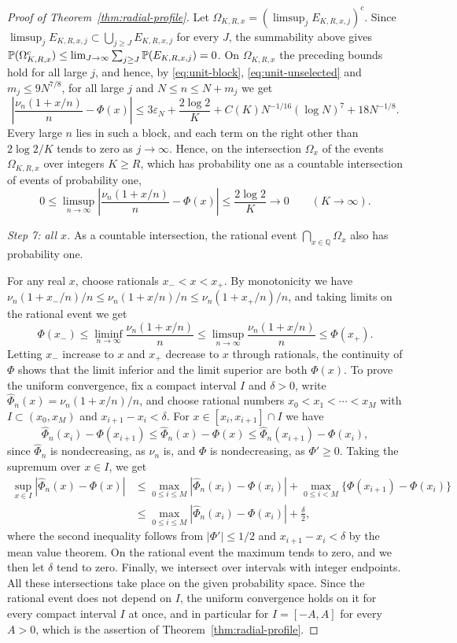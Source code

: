\begin{proof}[Proof of Theorem~\ref{thm:radial-profile}]
Let $\Omega_{K,R,x}=(\limsup_jE_{K,R,x,j})^c$.
Since $\limsup_jE_{K,R,x,j}\subset\bigcup_{j\ge J}E_{K,R,x,j}$ for every
$J$, the summability above gives
$\mathbb P(\Omega_{K,R,x}^c)\le\lim_{J\to\infty}\sum_{j\ge J}\mathbb P(E_{K,R,x,j})=0$.
On $\Omega_{K,R,x}$ the preceding bounds hold for all large $j$, and
hence, by \eqref{eq:unit-block}, \eqref{eq:unit-unselected} and
$m_j\le9N^{7/8}$, for all large $j$ and $N\le n\le N+m_j$ we get
\[
 \left|\frac{\nu_n(1+x/n)}n-\Phi(x)\right|
 \le3\varepsilon_N+\frac{2\log2}K+C(K)N^{-1/16}(\log N)^7+18N^{-1/8}.
\]
Every large $n$ lies in such a block, and each term on the right
other than $2\log2/K$ tends to zero as $j\to\infty$.
Hence, on the intersection $\Omega_x$ of the events $\Omega_{K,R,x}$ over
integers $K\ge R$, which has probability one as a countable intersection
of events of probability one,
\[
 0\le\limsup_{n\to\infty}
       \left|\frac{\nu_n(1+x/n)}n-\Phi(x)\right|
 \le\frac{2\log2}{K}\longrightarrow0
 \qquad(K\to\infty).
\]

\emph{Step 7: all $x$.}
As a countable intersection, the rational event
$\bigcap_{x\in\mathbb Q}\Omega_x$ also has probability one.

For any real $x$, choose rationals $x_-<x<x_+$. By monotonicity we have
$\nu_n(1+x_-/n)/n\le\nu_n(1+x/n)/n\le\nu_n(1+x_+/n)/n$, and taking
limits on the rational event we get
\[
 \Phi(x_-)\le\liminf_{n\to\infty}\frac{\nu_n(1+x/n)}n
 \le\limsup_{n\to\infty}\frac{\nu_n(1+x/n)}n
 \le\Phi(x_+).
\]
Letting $x_-$ increase to $x$ and $x_+$ decrease to $x$ through
rationals, the continuity of $\Phi$ shows that the limit inferior and the
limit superior are both $\Phi(x)$.
To prove the uniform convergence, fix a compact interval $I$ and
$\delta>0$, write $\widehat\Phi_n(x)=\nu_n(1+x/n)/n$, and choose rational
numbers $x_0<x_1<\cdots<x_M$ with $I\subset(x_0,x_M)$ and
$x_{i+1}-x_i<\delta$. For $x\in[x_i,x_{i+1}]\cap I$ we have
\[
 \widehat\Phi_n(x_i)-\Phi(x_{i+1})
 \le\widehat\Phi_n(x)-\Phi(x)
 \le\widehat\Phi_n(x_{i+1})-\Phi(x_i),
\]
since $\widehat\Phi_n$ is nondecreasing, as $\nu_n$ is, and $\Phi$ is
nondecreasing, as $\Phi'\ge0$.
Taking the supremum over $x\in I$, we get
\begin{align*}
 \sup_{x\in I}|\widehat\Phi_n(x)-\Phi(x)|
 &\le \max_{0\le i\le M}|\widehat\Phi_n(x_i)-\Phi(x_i)|
       +\max_{0\le i<M}\{\Phi(x_{i+1})-\Phi(x_i)\}\\
 &\le \max_{0\le i\le M}|\widehat\Phi_n(x_i)-\Phi(x_i)|
       +\frac{\delta}{2},
\end{align*}
where the second inequality follows from $|\Phi'|\le1/2$ and
$x_{i+1}-x_i<\delta$ by the mean value theorem.
On the rational event the maximum tends to zero, and we then let
$\delta$ tend to zero.
Finally, we intersect over intervals with integer endpoints.
All these intersections take place on the given probability space.
Since the rational event does not depend on $I$, the uniform convergence
holds on it for every compact interval $I$ at once, and in particular for
$I=[-A,A]$ for every $A>0$, which is the assertion of
Theorem~\ref{thm:radial-profile}.
\end{proof}

